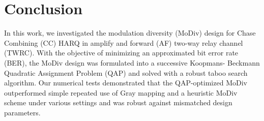 \documentclass[journal]{IEEEtran}
\begin{document}
\section{Conclusion}
\label{sec:conclusion}
In this work, we investigated the modulation diversity (MoDiv) design for
Chase Combining (CC) HARQ in amplify and forward (AF) two-way relay channel
(TWRC). With the objective of minimizing an approximated
bit error rate (BER), the MoDiv design was formulated into a successive Koopmans-
Beckmann Quadratic Assignment Problem (QAP) and solved with a robust taboo
search algorithm. Our numerical tests demonstrated that the QAP-optimized MoDiv
outperformed simple repeated use of Gray mapping and a heuristic MoDiv scheme
under various settings and was robust against mismatched design parameters.
%
%



%
%
\end{document}
